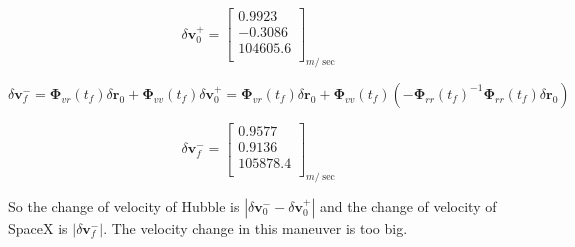 $$
\delta \boldsymbol v_0^+ = \begin{bmatrix}
    0.9923\\
    -0.3086\\
    104605.6\\
\end{bmatrix}_{m/\sec}
$$

$$
\delta \boldsymbol v_f^- = \boldsymbol \Phi_{vr}(t_f) \delta \boldsymbol r_0 + \boldsymbol \Phi_{vv}(t_f) \delta \boldsymbol v_0^+ = \boldsymbol \Phi_{vr}(t_f) \delta \boldsymbol r_0 + \boldsymbol \Phi_{vv}(t_f) \left(-\boldsymbol \Phi_{rr}(t_f)^{-1} \boldsymbol \Phi_{rr}(t_f) \delta \boldsymbol r_0 \right)
$$


$$
\delta \boldsymbol v_f^- = \begin{bmatrix}
    0.9577\\
    0.9136\\
    105878.4\\
\end{bmatrix}_{m/\sec}
$$

So the change of velocity of Hubble is $|\delta \boldsymbol v_0^- - \delta \boldsymbol v_0^+|$ and the change of velocity of SpaceX is $|\delta \boldsymbol v_f^-|$. The velocity change in this maneuver is too big.